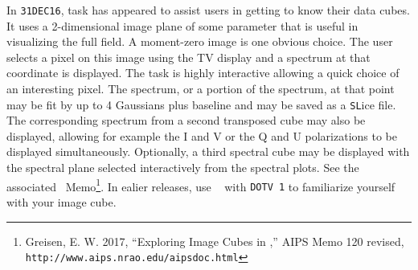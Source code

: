
     In {\tt 31DEC16}, task {\tt {}} has appeared to assist
users in getting to know their data cubes.  It uses a 2-dimensional
image plane of some parameter that is useful in visualizing the full
field.  A moment-zero image is one obvious choice.  The user selects a
pixel on this image using the TV display and a spectrum at that
coordinate is displayed.  The task is highly interactive allowing a
quick choice of an interesting pixel.  The spectrum, or a portion of
the spectrum, at that point may be fit by up to 4 Gaussians plus
baseline and may be saved as a {\tt SL}ice file.  The corresponding
spectrum from a second transposed cube may also be displayed, allowing
for example the I and V or the Q and U polarizations to be displayed
simultaneously.  Optionally, a third spectral cube may be displayed
with the spectral plane selected interactively from the spectral
plots.  See the associated \AIPS\ Memo\footnote{Greisen, E. W. 2017,
``Exploring Image Cubes in \AIPS,'' AIPS Memo 120 revised,  {\tt
http://www.aips.nrao.edu/aipsdoc.html}}.  In ealier releases, use {\tt
{}} with {\tt DOTV 1} to familiarize yourself with your
image cube.

